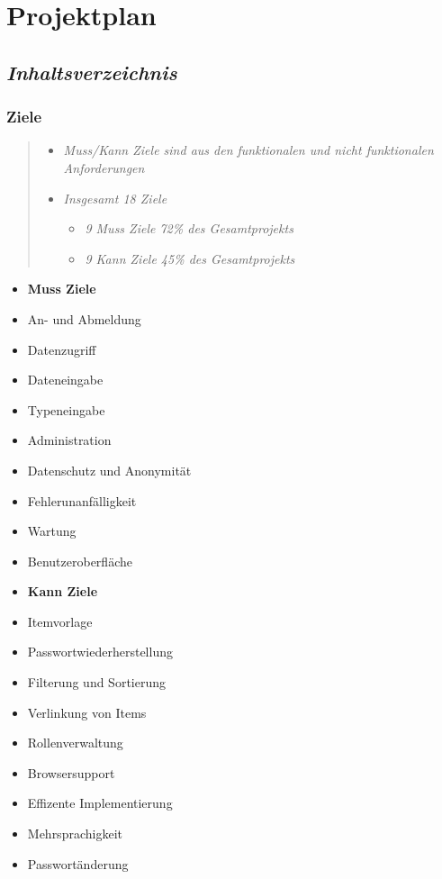 \section{Projektplan}\label{projektplan}

\subsection{\emph{Inhaltsverzeichnis}}\label{inhaltsverzeichnis}

\subsubsection{Ziele}\label{ziele}

\begin{quote}
\begin{itemize}
\itemsep1pt\parskip0pt
\item
  \emph{Muss/Kann Ziele sind aus den funktionalen und nicht funktionalen
  Anforderungen}
\item
  \emph{Insgesamt 18 Ziele}

  \begin{itemize}
  \itemsep1pt\parskip0pt
  \item
    \emph{9 Muss Ziele 72\% des Gesamtprojekts}
  \item
    \emph{9 Kann Ziele 45\% des Gesamtprojekts}
  \end{itemize}
\end{itemize}
\end{quote}

\begin{itemize}
\item
  \textbf{Muss Ziele}
\item
  An- und Abmeldung
\item
  Datenzugriff
\item
  Dateneingabe
\item
  Typeneingabe
\item
  Administration
\item
  Datenschutz und Anonymität
\item
  Fehlerunanfälligkeit
\item
  Wartung
\item
  Benutzeroberfläche
\item
  \textbf{Kann Ziele}
\item
  Itemvorlage
\item
  Passwortwiederherstellung
\item
  Filterung und Sortierung
\item
  Verlinkung von Items
\item
  Rollenverwaltung
\item
  Browsersupport
\item
  Effizente Implementierung
\item
  Mehrsprachigkeit
\item
  Passwortänderung
\end{itemize}


